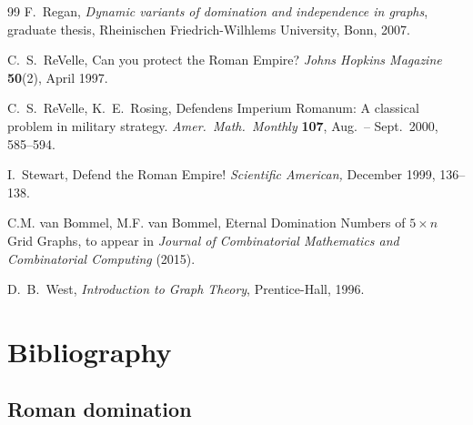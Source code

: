 \documentclass[12pt]{article}%
\begin{document}
\begin{thebibliography}{99}
F.~Regan, \emph{Dynamic variants of domination and
independence in graphs}, graduate thesis, Rheinischen Friedrich-Wilhlems
University, Bonn, 2007.

C.~S.~ReVelle, Can you protect the Roman Empire? \emph{Johns
Hopkins Magazine} \textbf{50}(2), April 1997.

C.~S.~ReVelle, K.~E.~Rosing, Defendens Imperium Romanum:
A classical problem in military strategy. \emph{Amer.~Math.~Monthly}
\textbf{107}, Aug.~-- Sept.~2000, 585--594.

I.~Stewart, Defend the Roman Empire! \emph{Scientific
American,} December 1999, 136--138.

C.M. van Bommel, M.F. van Bommel, Eternal Domination Numbers of
$5 \times n$ Grid Graphs, to appear in \textit{Journal of Combinatorial
Mathematics and Combinatorial Computing} (2015).

D.~B.~West, \emph{Introduction to Graph Theory}, Prentice-Hall, 1996.
\end{thebibliography}

\section*{Bibliography}

\subsection*{Roman domination}
\end{document}
